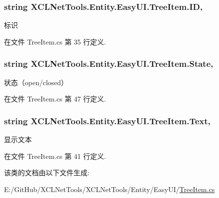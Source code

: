 \subsubsection[{\texorpdfstring{ID}{ID}}]{\setlength{\rightskip}{0pt plus 5cm}string X\+C\+L\+Net\+Tools.\+Entity.\+Easy\+U\+I.\+Tree\+Item.\+ID\hspace{0.3cm}{\ttfamily [get]}, {\ttfamily [set]}}\hypertarget{class_x_c_l_net_tools_1_1_entity_1_1_easy_u_i_1_1_tree_item_a93f2c5a6d4b3e1af4bd5c3e3fd4192f6}{}\label{class_x_c_l_net_tools_1_1_entity_1_1_easy_u_i_1_1_tree_item_a93f2c5a6d4b3e1af4bd5c3e3fd4192f6}


标识 



在文件 Tree\+Item.\+cs 第 35 行定义.

\subsubsection[{\texorpdfstring{State}{State}}]{\setlength{\rightskip}{0pt plus 5cm}string X\+C\+L\+Net\+Tools.\+Entity.\+Easy\+U\+I.\+Tree\+Item.\+State\hspace{0.3cm}{\ttfamily [get]}, {\ttfamily [set]}}\hypertarget{class_x_c_l_net_tools_1_1_entity_1_1_easy_u_i_1_1_tree_item_a79ad03a5903f54fdd4d60a3206105def}{}\label{class_x_c_l_net_tools_1_1_entity_1_1_easy_u_i_1_1_tree_item_a79ad03a5903f54fdd4d60a3206105def}


状态（open/closed） 



在文件 Tree\+Item.\+cs 第 47 行定义.

\subsubsection[{\texorpdfstring{Text}{Text}}]{\setlength{\rightskip}{0pt plus 5cm}string X\+C\+L\+Net\+Tools.\+Entity.\+Easy\+U\+I.\+Tree\+Item.\+Text\hspace{0.3cm}{\ttfamily [get]}, {\ttfamily [set]}}\hypertarget{class_x_c_l_net_tools_1_1_entity_1_1_easy_u_i_1_1_tree_item_ad85e722c4909d6b93ea2e80e7014ed0c}{}\label{class_x_c_l_net_tools_1_1_entity_1_1_easy_u_i_1_1_tree_item_ad85e722c4909d6b93ea2e80e7014ed0c}


显示文本 



在文件 Tree\+Item.\+cs 第 41 行定义.



该类的文档由以下文件生成\+:\begin{DoxyCompactItemize}
\item 
E\+:/\+Git\+Hub/\+X\+C\+L\+Net\+Tools/\+X\+C\+L\+Net\+Tools/\+Entity/\+Easy\+U\+I/\hyperlink{_tree_item_8cs}{Tree\+Item.\+cs}\end{DoxyCompactItemize}
